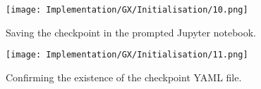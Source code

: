 \begin{figure}[H]
    \centering
    \texttt{[image: Implementation/GX/Initialisation/10.png]}
    \caption{Saving the checkpoint in the prompted Jupyter notebook.}
    \label{fig:GXCheckpoint2}
\end{figure}

\begin{figure}[H]
    \centering
    \texttt{[image: Implementation/GX/Initialisation/11.png]}
    \caption{Confirming the existence of the checkpoint YAML file.}
    \label{fig:GXCheckpoint3}
\end{figure}
